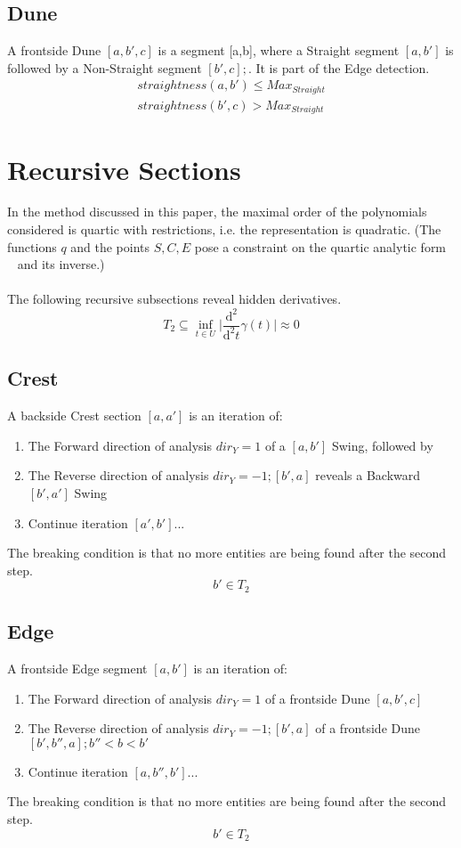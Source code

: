 \documentclass{report}
\begin{document}
\subsection{Dune}
A frontside Dune $[a,b',c]$ is a segment [a,b], where a Straight segment $[a,b']$ is followed by a Non-Straight segment $[b',c]; $. It is part of the Edge detection.
\begin{align}
straightness(a,b')\leq Max_{Straight}\\ straightness(b',c)> Max_{Straight}
\end{align}

\section{Recursive Sections}
In the method discussed in this paper, the maximal order of the polynomials considered is quartic with restrictions, i.e. the representation is quadratic.  (The functions $q$ and the points $S,C,E$ pose a constraint on the quartic analytic form ~\cite[Spline\_CharacteristicPolynomials.nb]{Stopeight} and its inverse.)\\\\
The following recursive subsections reveal hidden derivatives.
\begin{equation}
T_{2} \subseteq \inf_{t \in U} \lvert \frac{\mathrm{d}^2}{\mathrm{d}^2t}\gamma(t) \rvert \approx 0
\end{equation}

\subsection{Crest}
A backside Crest section $[a,a']$ is an iteration of:
\begin{enumerate}
\item The Forward direction of analysis $dir_{Y}=1$ of a $[a,b']$ Swing, followed by 
\item The Reverse direction of analysis $dir_{Y}=-1;[b',a]$ reveals a Backward $[b',a']$ Swing
\item Continue iteration $[a',b']...$
\end{enumerate}
The breaking condition is that no more entities are being found after the second step.
\begin{equation}
b' \in T_{2}
\end{equation}

\subsection{Edge}
A frontside Edge segment $[a,b']$ is an iteration of:
\begin{enumerate}
\item The Forward direction of analysis $dir_{Y}=1$ of a frontside Dune $[a,b',c]$
\item The Reverse direction of analysis $dir_{Y}=-1;[b',a]$ of a frontside Dune $[b',b'',a]; b''<b<b'$ 
\item Continue iteration $[a,b'',b']...$
\end{enumerate}
The breaking condition is that no more entities are being found after the second step.
\begin{equation}
b' \in T_{2}
\end{equation}
\end{document}
